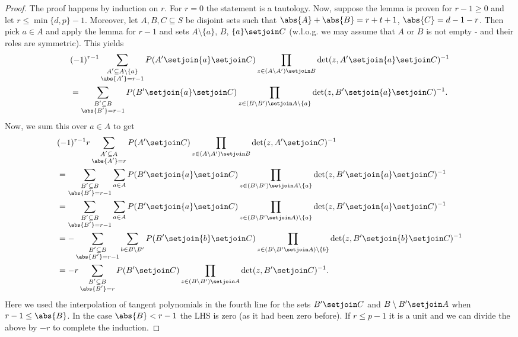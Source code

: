 \message{ !name(OnTheRAIDProblem.tex)}\documentclass[8pt,a4paper]{article}
\begin{document}
\begin{proof}
The proof happens by induction on $r$. For $r=0$ the statement is a
tautology.
Now, suppose the lemma is proven for $r-1\geq 0$ and let
$r\leq\min\{d,p\}-1$.
Moreover, let $A,B,C\subseteq S$ be disjoint sets such
that $\abs{A}+\abs{B}=r+t+1$, $\abs{C}=d-1-r$. Then pick $a\in A$ and
apply the lemma for $r-1$ and sets $A\setminus\{a\}$, $B$,
$\{a\}\setjoin C$ (w.l.o.g. we may assume that $A$ or $B$ is not empty
- and their roles are symmetric).
This yields
\begin{align*}
 &(-1)^{r-1}\sum_{\substack{A'\subseteq A\setminus\{a\}\\ \abs{A'}=r-1}}{P(A'\setjoin\{a\}\setjoin C)\prod_{z\in (A\setminus A')\setjoin B}{\det(z,A'\setjoin\{a\}\setjoin C)^{-1}}}\\
 &= \sum_{\substack{B'\subseteq B\\ \abs{B'}=r-1}}{P(B'\setjoin\{a\}\setjoin C)\prod_{z\in (B\setminus B')\setjoin A\setminus\{a\}}{\det(z,B'\setjoin\{a\}\setjoin C)^{-1}}}\text{.}
\end{align*}
Now, we sum this over $a\in A$ to get
\begin{align*}
 &(-1)^{r-1}r\sum_{\substack{A'\subseteq A\\ \abs{A'}=r}}{P(A'\setjoin C)\prod_{z\in (A\setminus A')\setjoin B}{\det(z,A'\setjoin C)^{-1}}}\\
 &= \sum_{\substack{B'\subseteq B\\ \abs{B'}=r-1}}{\sum_{a\in A}{P(B'\setjoin\{a\}\setjoin C)\prod_{z\in (B\setminus B')\setjoin A\setminus\{a\}}{\det(z,B'\setjoin\{a\}\setjoin C)^{-1}}}}\\
 &= \sum_{\substack{B'\subseteq B\\ \abs{B'}=r-1}}{\sum_{a\in A}{P(B'\setjoin\{a\}\setjoin C)\prod_{z\in (B\setminus B'\setjoin A)\setminus\{a\}}{\det(z,B'\setjoin\{a\}\setjoin C)^{-1}}}}\\
 &= -\sum_{\substack{B'\subseteq B\\ \abs{B'}=r-1}}{\sum_{b\in B\setminus B'}{P(B'\setjoin\{b\}\setjoin C)\prod_{z\in(B\setminus B'\setjoin A)\setminus\{b\}}{\det(z,B'\setjoin\{b\}\setjoin C)^{-1}}}}\\
 &= -r\sum_{\substack{B'\subseteq B\\ \abs{B'}=r}}{P(B'\setjoin C)\prod_{z\in (B\setminus B')\setjoin A}{\det(z,B'\setjoin C)^{-1}}}\text{.}
\end{align*}
Here we used the interpolation of tangent polynomials in the fourth
line for the sets $B'\setjoin C$ and $B\setminus B'\setjoin A$ when
$r-1\leq\abs{B}$. In the case $\abs{B}< r-1$ the LHS is zero (as it
had been zero before).
If $r\leq p-1$ it is a unit and we can divide the above by $-r$ to complete
the induction.
\end{proof}
\end{document}
